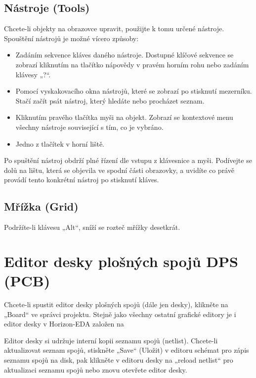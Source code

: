 \documentclass[letterpaper,10pt,czech]{sphinxmanual}
\begin{document}
\section{Nástroje (Tools)}
\label{\detokenize{imp_cz:nastroje-tools}}
Chcete-li objekty na obrazovce upravit, použijte k tomu určené nástroje. Spouštění nástrojů je možné vícero způsoby:
\begin{itemize}
\item {} 
Zadáním sekvence kláves daného nástroje. Dostupné klíčové sekvence se zobrazí kliknutím na tlačítko nápovědy v pravém horním rohu nebo zadáním klávesy „?“.

\item {} 
Pomocí vyskakovacího okna nástrojů, které se zobrazí po stisknutí mezerníku. Stačí začít psát nástroj, který hledáte nebo procházet seznam.

\item {} 
Kliknutím pravého tlačítka myši na objekt. Zobrazí se kontextové menu všechny nástroje související s tím, co je vybráno.

\item {} 
Jedno z tlačítek v horní liště.

\end{itemize}

Po spuštění nástroj obdrží plné řízení dle vstupu z klávesnice a myši.
Podívejte se dolů na lištu, která se objevila ve spodní části obrazovky, a uvidíte co právě provádí tento konkrétní nástroj po stisknutí kláves.


\section{Mřížka (Grid)}
\label{\detokenize{imp_cz:mrizka-grid}}
Podržíte-li klávesu „Alt“, sníží se rozteč mřížky desetkrát.


\chapter{Editor desky plošných spojů DPS (PCB)}
\label{\detokenize{imp-board_cz:editor-desky-plosnych-spoju-dps-pcb}}\label{\detokenize{imp-board_cz::doc}}
Chcete-li spustit editor desky plošných spojů (dále jen desky), klikněte na „Board“ ve správci projektu. Stejně jako všechny ostatní grafické editory je i editor desky v Horizon-EDA založen na {\hyperref[\detokenize{imp_cz::doc}]{}}

Editor desky si udržuje interní kopii seznamu spojů (netlist). Chcete-li aktualizovat
seznam spojů, stiskněte „Save“ (Uložit) v editoru schémat pro zápis seznamu spojů na
disk, pak klikněte v editoru desky na „reload netlist“ pro aktualizaci seznamu spojů nebo znovu otevřete editor desky.
\end{document}
